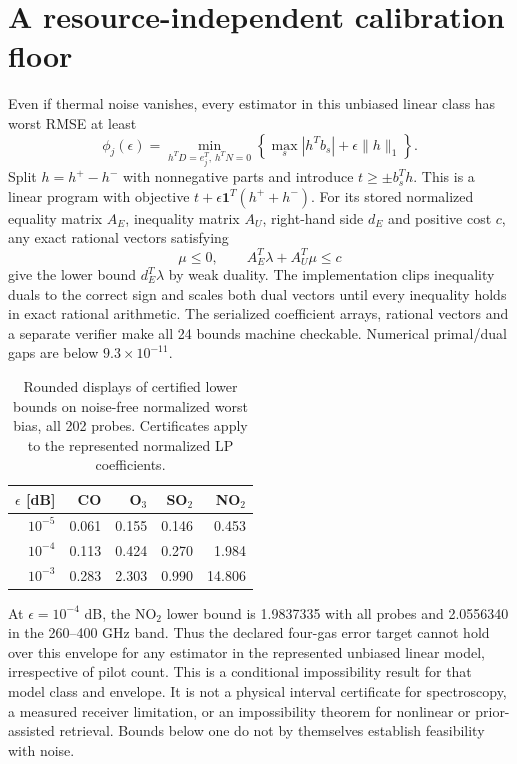 \section{A resource-independent calibration floor}
Even if thermal noise vanishes, every estimator in this unbiased linear class has worst RMSE at least
\begin{equation}
\phi_j(\epsilon)=\min_{h^TD=e_j^T,\,h^TN=0}
\left\{\max_s|h^Tb_s|+\epsilon\|h\|_1\right\}.
\label{eq:bias-floor}
\end{equation}
Split $h=h^+-h^-$ with nonnegative parts and introduce $t\ge\pm b_s^Th$. This is a linear program with objective $t+\epsilon\mathbf1^T(h^++h^-)$. For its stored normalized equality matrix $A_E$, inequality matrix $A_U$, right-hand side $d_E$ and positive cost $c$, any exact rational vectors satisfying
\[
\mu\le0,\qquad A_E^T\lambda+A_U^T\mu\le c
\]
give the lower bound $d_E^T\lambda$ by weak duality. The implementation clips inequality duals to the correct sign and scales both dual vectors until every inequality holds in exact rational arithmetic. The serialized coefficient arrays, rational vectors and a separate verifier make all 24 bounds machine checkable. Numerical primal/dual gaps are below $9.3\times10^{-11}$.

\begin{table}[t]\centering\scriptsize
\caption{Rounded displays of certified lower bounds on noise-free normalized worst bias, all 202 probes. Certificates apply to the represented normalized LP coefficients.}
\begin{tabular}{rrrrr}\toprule
$\epsilon$ [dB] & CO & O$_3$ & SO$_2$ & NO$_2$\\\midrule
$10^{-5}$ & 0.061 & 0.155 & 0.146 & 0.453\\
$10^{-4}$ & 0.113 & 0.424 & 0.270 & 1.984\\
$10^{-3}$ & 0.283 & 2.303 & 0.990 & 14.806\\
\bottomrule\end{tabular}

\end{table}
At $\epsilon=10^{-4}$ dB, the NO$_2$ lower bound is 1.9837335 with all probes and 2.0556340 in the 260--400 GHz band. Thus the declared four-gas error target cannot hold over this envelope for any estimator in the represented unbiased linear model, irrespective of pilot count. This is a conditional impossibility result for that model class and envelope. It is not a physical interval certificate for spectroscopy, a measured receiver limitation, or an impossibility theorem for nonlinear or prior-assisted retrieval. Bounds below one do not by themselves establish feasibility with noise.

